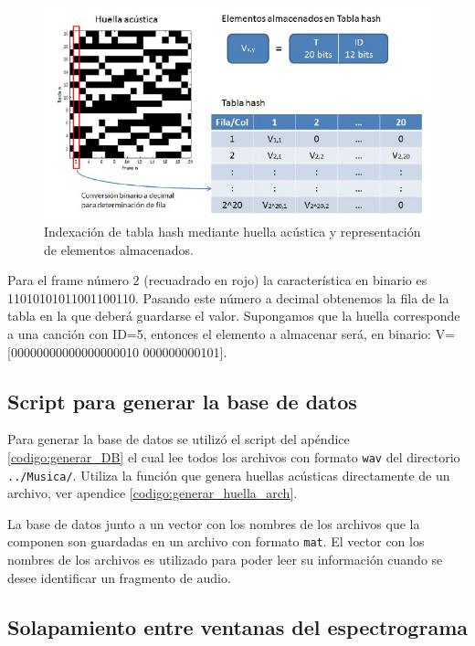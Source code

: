 \documentclass[10pt,spanish,a4paper,openany,notitlepage]{article}
\begin{document}
\begin{figure}[H] %
\begin{center}
\includegraphics[scale=0.8]{./imagenes/bd.png}
\caption{Indexación de tabla hash mediante huella acústica y representación de elementos almacenados.}
 \label{fig:bd}
\end{center}
\end{figure}

Para el frame número 2 (recuadrado en rojo) la característica en binario es
11010101011001100110. Pasando este número a decimal obtenemos la fila de la tabla
en la que deberá guardarse el valor. Supongamos que la huella corresponde a una canción
con ID=5, entonces el elemento a almacenar será, en binario:
V=[00000000000000000010 000000000101].

\subsection{Script para generar la base de datos}

Para generar la base de datos se utilizó el script del apéndice \ref{codigo:generar_DB}
el cual lee todos los archivos con formato \texttt{wav} del directorio \texttt{../Musica/}.
Utiliza la función que genera huellas acústicas directamente de un archivo, ver
apendice \ref{codigo:generar_huella_arch}.

La base de datos junto a un vector con los nombres de los archivos
que la componen son guardadas en un archivo con formato \texttt{mat}.
El vector con los nombres de los archivos es utilizado para poder
leer su información cuando se desee identificar un fragmento de audio.

\subsection{Solapamiento entre ventanas del espectrograma}
\end{document}
